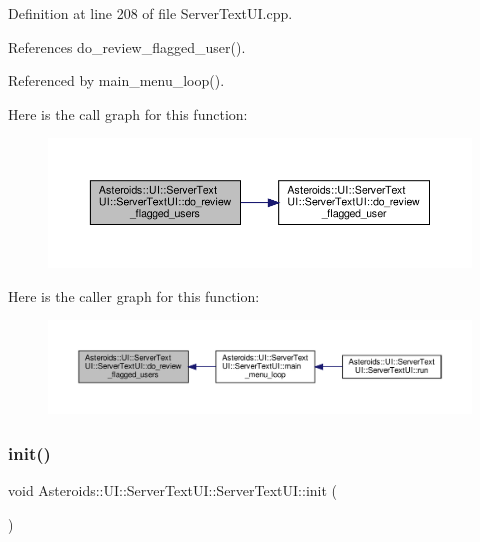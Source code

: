 Definition at line 208 of file Server\+Text\+U\+I.\+cpp.



References do\+\_\+review\+\_\+flagged\+\_\+user().



Referenced by main\+\_\+menu\+\_\+loop().

Here is the call graph for this function\+:\nopagebreak
\begin{figure}[H]
\begin{center}
\leavevmode
\includegraphics[width=350pt]{classAsteroids_1_1UI_1_1ServerTextUI_1_1ServerTextUI_a5518087c5d0ab9fd8c24c1b6948ee11b_cgraph}
\end{center}
\end{figure}
Here is the caller graph for this function\+:\nopagebreak
\begin{figure}[H]
\begin{center}
\leavevmode
\includegraphics[width=350pt]{classAsteroids_1_1UI_1_1ServerTextUI_1_1ServerTextUI_a5518087c5d0ab9fd8c24c1b6948ee11b_icgraph}
\end{center}
\end{figure}
\mbox{\label{classAsteroids_1_1UI_1_1ServerTextUI_1_1ServerTextUI_aa01e964f791e5ea9840f7a49a3e55736}} 
\subsubsection{\texorpdfstring{init()}{init()}}
{\footnotesize\ttfamily void Asteroids\+::\+U\+I\+::\+Server\+Text\+U\+I\+::\+Server\+Text\+U\+I\+::init (\begin{DoxyParamCaption}{ }\end{DoxyParamCaption})\hspace{0.3cm}{\ttfamily [private]}}



